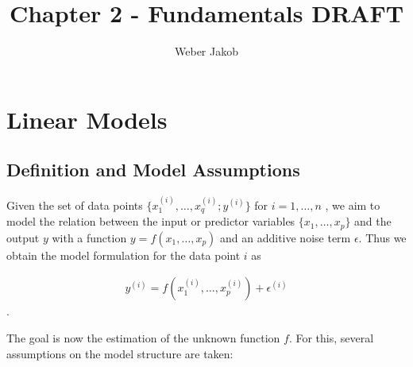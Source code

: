 \documentclass[10pt,a4paper]{article}
\title{Chapter 2 - Fundamentals DRAFT}
\author{Weber Jakob}
\begin{document}
\maketitle

\tableofcontents
\section{Linear Models} \label{SectionLinModel}
	
\subsection{Definition and Model Assumptions}  \label{subsec:SubsectionLinModelDefAndAssump}

Given the set of data points $\{x^{(i)}_1, \dots, x^{(i)}_q; y^{(i)} \}$ for $i = 1, \dots, n$ , we aim to model the relation between the input or predictor variables $\{x_1, \dots, x_p\}$ and the output $y$ with a function $y = f(x_1, \dots, x_p)$ and an additive noise term $\epsilon$. Thus we obtain the model formulation for the data point $i$ as

\begin{align} \label{eq:lin_mod_single_data_point}
	y^{(i)} = f(x^{(i)}_{1}, \dots, x^{(i)}_{p}) + \epsilon^{(i)}
\end{align}.

The goal is now the estimation of the unknown function $f$. For this, several assumptions on the model structure are taken:
\end{document}
